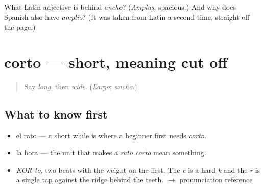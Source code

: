 \begin{tcolorbox}[breakable,colback=teal!4,colframe=teal!35!black,title={Before you move on}]
What Latin adjective is behind \emph{ancho}? (\emph{Amplus}, spacious.) And why does Spanish also have \emph{amplio}? (It was taken from Latin a second time, straight off the page.)
\end{tcolorbox}
\section[corto]{corto — short, meaning cut off}

\label{lesson:ES-C365-corto}



\begin{quote}
Say \emph{long}, then \emph{wide}. (\emph{Largo}; \emph{ancho}.)
\end{quote}

\subsection*{What to know first}
\begin{itemize}
\raggedright
  \item el rato — a short while is where a beginner first needs \emph{corto}.
  \item la hora — the unit that makes a \emph{rato corto} mean something.
\end{itemize}

\begin{sounds}
\begin{itemize}
\raggedright
  \item \emph{KOR-to}, two beats with the weight on the first. The \emph{c} is a hard \emph{k} and the \emph{r} is a single tap against the ridge behind the teeth. $\to$ pronunciation reference
\end{itemize}
\end{sounds}

